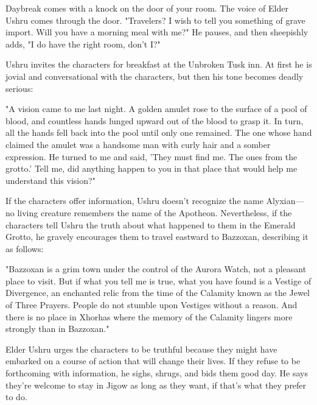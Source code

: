 \documentclass[10pt,a4paper,twoside,twocolumn,openany,nodeprecatedcode]{dndbook}
\begin{document}
\begin{DndReadAloud}{}
Daybreak comes with a knock on the door of your room. The voice of Elder Ushru comes through the door. "Travelers? I wish to tell you something of grave import. Will you have a morning meal with me?" He pauses, and then sheepishly adds, "I do have the right room, don't I?"

\end{DndReadAloud}

Ushru invites the characters for breakfast at the Unbroken Tusk inn. At first he is jovial and conversational with the characters, but then his tone becomes deadly serious:

\begin{DndReadAloud}{}
"A vision came to me last night. A golden amulet rose to the surface of a pool of blood, and countless hands lunged upward out of the blood to grasp it. In turn, all the hands fell back into the pool until only one remained. The one whose hand claimed the amulet was a handsome man with curly hair and a somber expression. He turned to me and said, 'They must find me. The ones from the grotto.' Tell me, did anything happen to you in that place that would help me understand this vision?"

\end{DndReadAloud}

If the characters offer information, Ushru doesn't recognize the name Alyxian—no living creature remembers the name of the Apotheon. Nevertheless, if the characters tell Ushru the truth about what happened to them in the Emerald Grotto, he gravely encourages them to travel eastward to Bazzoxan, describing it as follows:

\begin{DndReadAloud}{}
"Bazzoxan is a grim town under the control of the Aurora Watch, not a pleasant place to visit. But if what you tell me is true, what you have found is a Vestige of Divergence, an enchanted relic from the time of the Calamity known as the Jewel of Three Prayers. People do not stumble upon Vestiges without a reason. And there is no place in Xhorhas where the memory of the Calamity lingers more strongly than in Bazzoxan."

\end{DndReadAloud}

Elder Ushru urges the characters to be truthful because they might have embarked on a course of action that will change their lives. If they refuse to be forthcoming with information, he sighs, shrugs, and bids them good day. He says they're welcome to stay in Jigow as long as they want, if that's what they prefer to do.
\end{document}
